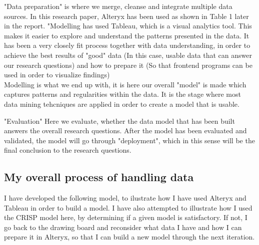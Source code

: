 \documentclass{article}
\begin{document}
"Data preparation" is where we merge, cleanse and integrate multiple data sources. In this research paper, Alteryx has been used as shown in Table 1 later in the report.
"Modelling has used Tableau, which is a visual analytics tool. This makes it easier to explore and understand the patterns presented in the data. It has been a very closely fit process together with data understanding, in order to achieve the best results of "good" data (In this case, usable data that can answer our research questions)  and how to prepare it (So that frontend programs can be used in order to visualize  findings) \\

Modelling is what we end up with, it is here our overall "model" is made which captures patterns and regularities within the data. It is the stage where most data mining tehcniques are applied in order to create a model that is usable.

"Evaluation" Here we evaluate, whether the data model that has been built answers the overall research questions. After the model has been evaluated and validated, the model will go through "deployment", which in this sense will be the final conclusion to
the research questions.\\


\subsection {My overall process of handling data}

I have developed the following model, to ilustrate how I have used Alteryx and Tableau in order to build a model. I have also attempted to illustrate how I used the CRISP model here, by determining if a given model is satisfactory. If not, I go back to the drawing board and reconsider what data I have and how I can prepare it in Alteryx, so that I can build a new model through the next iteration.
\end{document}
